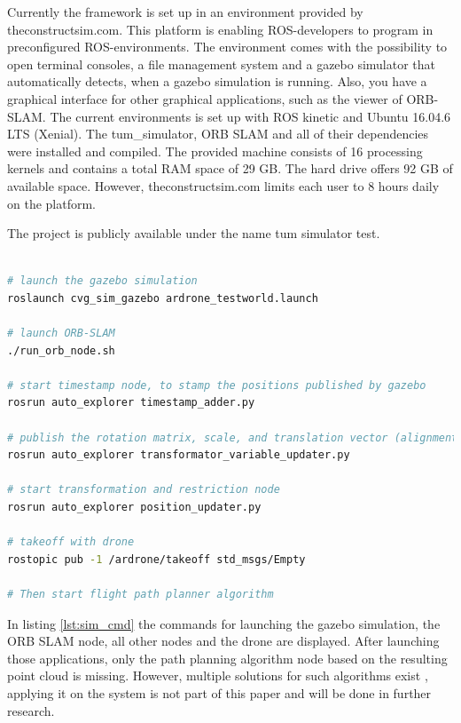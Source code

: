 	Currently the framework is set up in an environment provided by theconstructsim.com. This platform is enabling ROS-developers to program in preconfigured
	ROS-environments. The environment comes with the possibility to open terminal consoles, a file management system and a gazebo simulator that automatically 
	detects, when a gazebo simulation is running. Also, you have a graphical interface for other graphical applications, such as the viewer of ORB-SLAM.
	The current environments is set up with ROS kinetic and Ubuntu 16.04.6 LTS (Xenial). The tum\_simulator, ORB SLAM and all of their dependencies were installed and compiled. 
	The provided machine consists of 16 processing kernels and contains a total RAM space of 29 GB.  The hard drive offers 92 GB of available space. However, 
	theconstructsim.com limits each user to 8 hours daily on the platform. 
	
	The project is publicly available under the name tum simulator test.
	
	\begin{lstlisting}[language=bash, caption= Launching the simulated environment, label=lst:sim_cmd]
	
# launch the gazebo simulation
roslaunch cvg_sim_gazebo ardrone_testworld.launch
	
# launch ORB-SLAM
./run_orb_node.sh

# start timestamp node, to stamp the positions published by gazebo
rosrun auto_explorer timestamp_adder.py

# publish the rotation matrix, scale, and translation vector (alignment node)
rosrun auto_explorer transformator_variable_updater.py

# start transformation and restriction node
rosrun auto_explorer position_updater.py
	
# takeoff with drone 
rostopic pub -1 /ardrone/takeoff std_msgs/Empty

# Then start flight path planner algorithm

	\end{lstlisting}
	
	In listing \ref{lst:sim_cmd} the commands for launching the gazebo simulation, the ORB SLAM node, all other nodes and the drone are displayed. After launching those 
	applications, only the path planning algorithm node based on the resulting point cloud is missing. However, multiple solutions for such algorithms 
	exist \cite{path}, applying it on the system is not part of this paper and will be done in further research. 
	
